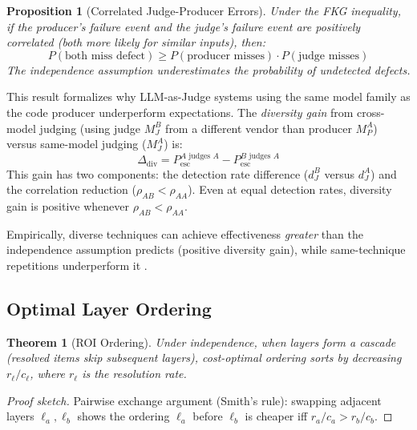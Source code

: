 \documentclass[11pt, a4paper, logo, copyright]{googledeepmind}
\newtheorem{theorem}{Theorem}[section]
\newtheorem{proposition}{Proposition}[section]
\begin{document}
\begin{proposition}[Correlated Judge-Producer Errors]
\label{prop:fkg}
Under the FKG inequality, if the producer's failure event and the judge's failure event are positively correlated (both more likely for similar inputs), then:
\begin{equation}
    P(\text{both miss defect}) \geq P(\text{producer misses}) \cdot P(\text{judge misses})
\end{equation}
The independence assumption \emph{underestimates} the probability of undetected defects.
\end{proposition}

This result formalizes why LLM-as-Judge systems using the same model family as the code producer underperform expectations. The \emph{diversity gain} from cross-model judging (using judge $M_J^B$ from a different vendor than producer $M_P^A$) versus same-model judging ($M_J^A$) is:
\begin{equation}
\Delta_{\mathrm{div}} = P_{\mathrm{esc}}^{A \text{ judges } A} - P_{\mathrm{esc}}^{B \text{ judges } A}
\end{equation}
This gain has two components: the detection rate difference ($d_J^B$ versus $d_J^A$) and the correlation reduction ($\rho_{AB} < \rho_{AA}$). Even at equal detection rates, diversity gain is positive whenever $\rho_{AB} < \rho_{AA}$.

Empirically, diverse techniques can achieve effectiveness \emph{greater} than the independence assumption predicts (positive diversity gain), while same-technique repetitions underperform it \citep{littlewood2000}.

\subsection{Optimal Layer Ordering}

\begin{theorem}[ROI Ordering]
\label{thm:roi-ordering}
Under independence, when layers form a cascade (resolved items skip subsequent layers), cost-optimal ordering sorts by decreasing $r_\ell / c_\ell$, where $r_\ell$ is the resolution rate.
\end{theorem}

\begin{proof}[Proof sketch]
Pairwise exchange argument (Smith's rule): swapping adjacent layers $\ell_a, \ell_b$ shows the ordering $\ell_a$ before $\ell_b$ is cheaper iff $r_a / c_a > r_b / c_b$.
\end{proof}
\end{document}
